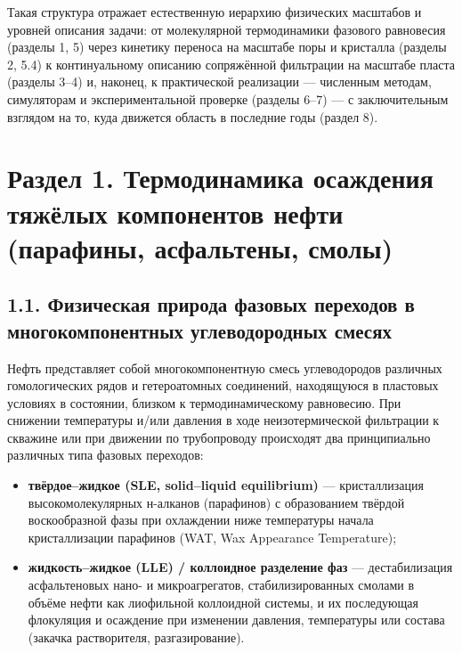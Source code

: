 \documentclass[11pt]{extarticle}
\providecommand{\tightlist}{\setlength{\itemsep}{0pt}\setlength{\parskip}{0pt}}
\begin{document}
Такая структура отражает естественную иерархию физических масштабов и уровней описания задачи: от молекулярной термодинамики фазового равновесия (разделы 1, 5) через кинетику переноса на масштабе поры и кристалла (разделы 2, 5.4) к континуальному описанию сопряжённой фильтрации на масштабе пласта (разделы 3--4) и, наконец, к практической реализации --- численным методам, симуляторам и экспериментальной проверке (разделы 6--7) --- с заключительным взглядом на то, куда движется область в последние годы (раздел 8).

\newpage

\section{Раздел 1. Термодинамика осаждения тяжёлых компонентов нефти (парафины, асфальтены, смолы)}\label{ux440ux430ux437ux434ux435ux43b-1.-ux442ux435ux440ux43cux43eux434ux438ux43dux430ux43cux438ux43aux430-ux43eux441ux430ux436ux434ux435ux43dux438ux44f-ux442ux44fux436ux451ux43bux44bux445-ux43aux43eux43cux43fux43eux43dux435ux43dux442ux43eux432-ux43dux435ux444ux442ux438-ux43fux430ux440ux430ux444ux438ux43dux44b-ux430ux441ux444ux430ux43bux44cux442ux435ux43dux44b-ux441ux43cux43eux43bux44b}

\subsection{1.1. Физическая природа фазовых переходов в многокомпонентных углеводородных смесях}\label{ux444ux438ux437ux438ux447ux435ux441ux43aux430ux44f-ux43fux440ux438ux440ux43eux434ux430-ux444ux430ux437ux43eux432ux44bux445-ux43fux435ux440ux435ux445ux43eux434ux43eux432-ux432-ux43cux43dux43eux433ux43eux43aux43eux43cux43fux43eux43dux435ux43dux442ux43dux44bux445-ux443ux433ux43bux435ux432ux43eux434ux43eux440ux43eux434ux43dux44bux445-ux441ux43cux435ux441ux44fux445}

Нефть представляет собой многокомпонентную смесь углеводородов различных гомологических рядов и гетероатомных соединений, находящуюся в пластовых условиях в состоянии, близком к термодинамическому равновесию. При снижении температуры и/или давления в ходе неизотермической фильтрации к скважине или при движении по трубопроводу происходят два принципиально различных типа фазовых переходов:

\begin{itemize}
\tightlist
\item
  \textbf{твёрдое--жидкое (SLE, solid--liquid equilibrium)} --- кристаллизация высокомолекулярных н-алканов (парафинов) с образованием твёрдой воскообразной фазы при охлаждении ниже температуры начала кристаллизации парафинов (WAT, Wax Appearance Temperature);
\item
  \textbf{жидкость--жидкое (LLE) / коллоидное разделение фаз} --- дестабилизация асфальтеновых нано- и микроагрегатов, стабилизированных смолами в объёме нефти как лиофильной коллоидной системы, и их последующая флокуляция и осаждение при изменении давления, температуры или состава (закачка растворителя, разгазирование).
\end{itemize}
\end{document}
